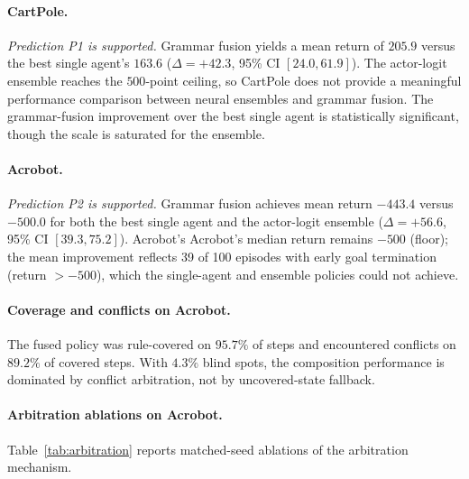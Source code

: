 \documentclass[12pt]{article}
\begin{document}
\paragraph{CartPole.}
\emph{Prediction P1 is supported.}
Grammar fusion yields a mean return of $205.9$ versus the best single
agent's $163.6$ ($\Delta = +42.3$, 95\% CI $[24.0, 61.9]$).
The actor-logit ensemble reaches the $500$-point ceiling, so CartPole
does not provide a meaningful performance comparison between neural
ensembles and grammar fusion.
The grammar-fusion improvement over the best single agent is
statistically significant, though the scale is saturated for the ensemble.

\paragraph{Acrobot.}
\emph{Prediction P2 is supported.}
Grammar fusion achieves mean return $-443.4$ versus $-500.0$ for both
the best single agent and the actor-logit ensemble
($\Delta = +56.6$, 95\% CI $[39.3, 75.2]$).
Acrobot's Acrobot's median return remains $-500$ (floor); the mean improvement
reflects 39 of 100 episodes with early goal termination (return $> -500$),
which the single-agent and ensemble policies could not achieve.

\paragraph{Coverage and conflicts on Acrobot.}
The fused policy was rule-covered on $95.7\%$ of steps and encountered
conflicts on $89.2\%$ of covered steps.
With $4.3\%$ blind spots, the composition performance is dominated by
conflict arbitration, not by uncovered-state fallback.

\paragraph{Arbitration ablations on Acrobot.}
Table~\ref{tab:arbitration} reports matched-seed ablations of the
arbitration mechanism.
\end{document}
